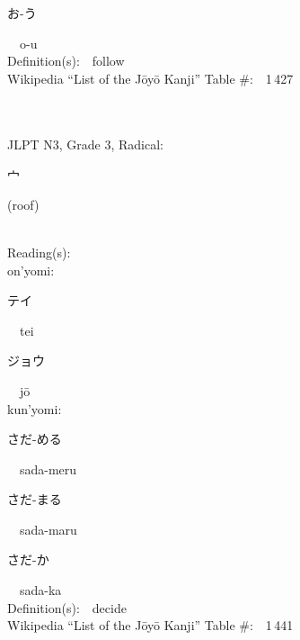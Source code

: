 \begin{multicols}{2}
{\hspace*{2em}}{\begin{CJK}{UTF8}{min} お-う \end{CJK}}\ \ o-u\ \ \\
Definition(s):\ \ follow \\
Wikipedia ``List of the J\=oy\=o Kanji'' Table \#:\ \ 1\,427 \\
\ \ \\
{\fontsize{34pt}{40pt}  }\ \ \\  %
{JLPT N3, Grade 3, Radical:\ \ {\begin{CJK}{UTF8}{min} 宀 \end{CJK}} (roof) } \\
Reading(s):\ \ \\
{\hspace*{1em}}on'yomi:\ \ \\
{\hspace*{2em}}{\begin{CJK}{UTF8}{min} テイ \end{CJK}}\ \ tei\ \ \\
{\hspace*{2em}}{\begin{CJK}{UTF8}{min} ジョウ \end{CJK}}\ \ j\=o\ \ \\
{\hspace*{1em}}kun'yomi:\ \ \\
{\hspace*{2em}}{\begin{CJK}{UTF8}{min} さだ-める \end{CJK}}\ \ sada-meru\ \ \\
{\hspace*{2em}}{\begin{CJK}{UTF8}{min} さだ-まる \end{CJK}}\ \ sada-maru\ \ \\
{\hspace*{2em}}{\begin{CJK}{UTF8}{min} さだ-か \end{CJK}}\ \ sada-ka\ \ \\
Definition(s):\ \ decide \\
Wikipedia ``List of the J\=oy\=o Kanji'' Table \#:\ \ 1\,441 \\
\ \ \\
{\fontsize{34pt}{40pt}  }\ \ \\  %

\end{multicols}
